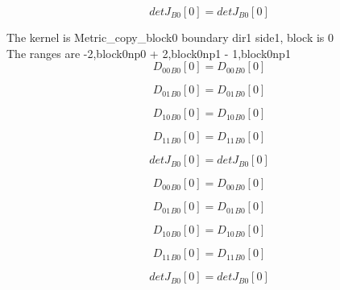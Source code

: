 \documentclass{article}
\begin{document}
\begin{dmath}{detJ{_{B0}}}[{0}] = {detJ{_{B0}}}[{0}]\end{dmath}

\noindent The kernel is Metric_copy_block0 boundary dir1 side1, block is 0\\\noindent The ranges are -2,block0np0 + 2,block0np1 - 1,block0np1\\\begin{dmath}{D_{00}{_{B0}}}[{0}] = {D_{00}{_{B0}}}[{0}]\end{dmath}

\begin{dmath}{D_{01}{_{B0}}}[{0}] = {D_{01}{_{B0}}}[{0}]\end{dmath}

\begin{dmath}{D_{10}{_{B0}}}[{0}] = {D_{10}{_{B0}}}[{0}]\end{dmath}

\begin{dmath}{D_{11}{_{B0}}}[{0}] = {D_{11}{_{B0}}}[{0}]\end{dmath}

\begin{dmath}{detJ{_{B0}}}[{0}] = {detJ{_{B0}}}[{0}]\end{dmath}

\begin{dmath}{D_{00}{_{B0}}}[{0}] = {D_{00}{_{B0}}}[{0}]\end{dmath}

\begin{dmath}{D_{01}{_{B0}}}[{0}] = {D_{01}{_{B0}}}[{0}]\end{dmath}

\begin{dmath}{D_{10}{_{B0}}}[{0}] = {D_{10}{_{B0}}}[{0}]\end{dmath}

\begin{dmath}{D_{11}{_{B0}}}[{0}] = {D_{11}{_{B0}}}[{0}]\end{dmath}

\begin{dmath}{detJ{_{B0}}}[{0}] = {detJ{_{B0}}}[{0}]\end{dmath}
\end{document}
